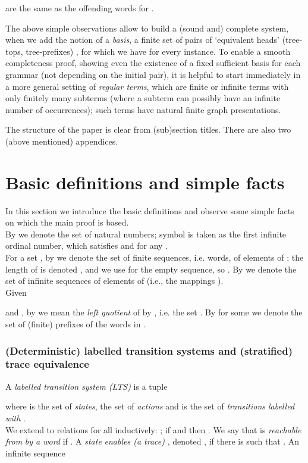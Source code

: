 \documentclass[12pt]{article}
\begin{document}
are
the same as the offending words for . 

The above simple observations allow to build a (sound and) 
complete system,
when we add the notion of a \emph{basis}, a finite set of pairs of `equivalent heads'
(tree-tops, tree-prefixes)
, for which 
we have  for every instance.
To enable a smooth completeness proof, showing
even the existence of a fixed sufficient basis
 for each grammar  (not depending on the initial pair),
it is helpful
to start immediately in a more general setting of
\emph{regular terms}, 
which are finite or infinite terms with only finitely many
subterms (where a subterm can possibly have an infinite number of
occurrences); such terms have natural finite graph presentations.


The structure of the paper is clear from (sub)section titles.
There are also two (above mentioned) appendices.




\section{Basic definitions and simple facts}
\label{sec:definitions}

In this section we introduce the basic definitions and observe 
some simple facts on which the main proof is based. 
\\
By  we denote the 
set  of natural numbers; symbol  
is taken as the first infinite ordinal number,
which satisfies  and  for any
.
\\
For a set , by  
we denote the set of finite sequences, i.e. words, of
elements of ; the length of  is denoted 
,
and we use  for the empty sequence,
so .
By  we denote the set of infinite
sequences of
elements of  (i.e., the mappings ).
\\
Given 

and , by  we mean the
\emph{left quotient} of  by , i.e. the set
. 
By  for some
 we denote the set of (finite) prefixes of the words in .

\subsubsection*{(Deterministic) labelled transition systems and 
(stratified) trace
equivalence}


A \emph{labelled transition system (LTS)} is a tuple

where  is the set of \emph{states},  the set of
\emph{actions} 
and  is the set of
\emph{transitions labelled with} .
\\
We extend  to relations  for all  inductively:
; if  and  then
. We say that  is \emph{reachable 
from}  \emph{by
a word}  if .
A \emph{state}  \emph{enables (a trace)}
, denoted , if there is  such that 
 . An infinite sequence 
  
\end{document}
